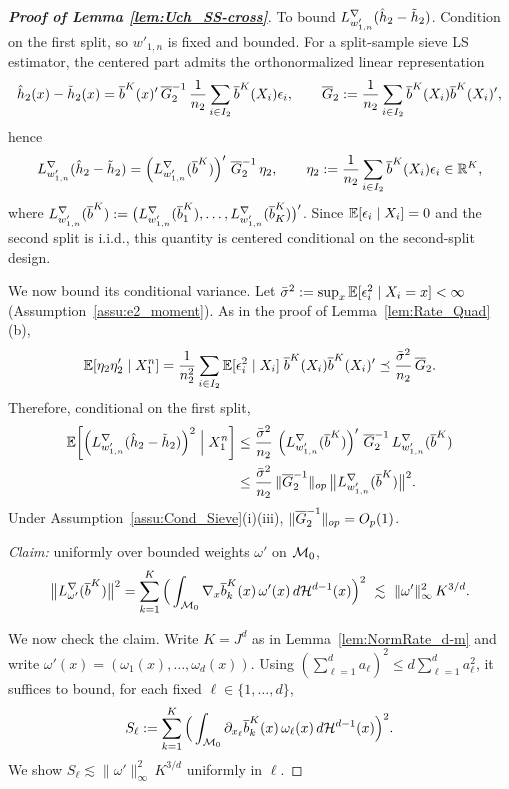 \documentclass[12pt,american]{article}
\newcommand{\cH}{\mathcal{H}}
\theoremstyle{definition}
\theoremstyle{plain}
\theoremstyle{definition}
\theoremstyle{plain}
\theoremstyle{plain}
\theoremstyle{plain}
\theoremstyle{plain}
\theoremstyle{plain}
\newcommand{\R}{\mathbb{R}}
\newcommand{\E}{\mathbb{E}}
\begin{document}
\begin{proof}[\textbf{Proof of Lemma \ref{lem:Uch_SS-cross}}]
To bound $L^{\nabla}_{w'_{1,n}}(\hat h_2-\tilde{h}_2)$.
Condition on the first split, so $w'_{1,n}$ is fixed and bounded.
For a split-sample sieve LS estimator, the centered part admits the orthonormalized linear representation
\[
\hat h_2(x)-\tilde{h}_2(x)
=\overline{b}^K(x)^{\prime}\,\overline{G}_2^{-1}\,\frac1{n_2}\sum_{i\in I_2}\overline{b}^K(X_i)\epsilon_i,
\qquad
\overline{G}_2:=\frac1{n_2}\sum_{i\in I_2}\overline{b}^K(X_i)\overline{b}^K(X_i)^{\prime},
\]
hence
\[
L^{\nabla}_{w'_{1,n}}(\hat h_2-\td h_2)
=
\left(L^{\nabla}_{w'_{1,n}}(\ol b^K)\right)^{\prime}\,
\ol G_2^{-1}\,\eta_2,
\qquad
\eta_2:=\frac1{n_2}\sum_{i\in I_2}\ol b^K(X_i)\e_i\in\R^K,
\]
where $L^{\nabla}_{w'_{1,n}}(\overline{b}^K):=\big(L^{\nabla}_{w'_{1,n}}(\overline{b}_1^K),\dots,L^{\nabla}_{w'_{1,n}}(\overline{b}_K^K)\big)^{\prime}$.
Since $\E[\e_i\mid X_i]=0$ and the second split is i.i.d., this quantity is centered conditional on the second-split design.

We now bound its conditional variance.
Let $\bar\s^2:=\sup_x \E[\e_i^2\mid X_i=x]<\infty$ (Assumption~\ref{assu:e2_moment}).
As in the proof of Lemma~\ref{lem:Rate_Quad}(b),
\[
\E[\eta_2\eta_2'\mid X_1^n]
=\frac1{n_2^2}\sum_{i\in I_2}\E[\e_i^2\mid X_i]\;\ol b^K(X_i)\ol b^K(X_i)'
\preceq \frac{\bar\s^2}{n_2}\,\ol G_2.
\]
Therefore, conditional on the first split,
\begin{align}
\E\!\left[\left(L^{\nabla}_{w'_{1,n}}(\hat h_2-\td h_2)\right)^2\Bigm| X_1^n\right]
&\le \frac{\bar\s^2}{n_2}\,
\left(L^{\nabla}_{w'_{1,n}}(\ol b^K)\right)^{\prime}\,
\ol G_2^{-1}\,
L^{\nabla}_{w'_{1,n}}(\ol b^K) \notag\\
&\le \frac{\bar\s^2}{n_2}\,\|\ol G_2^{-1}\|_{op}\,\big\|L^{\nabla}_{w'_{1,n}}(\ol b^K)\big\|^2 .
\label{eq:Var_Lgrad}
\end{align}
Under Assumption~\ref{assu:Cond_Sieve}(i)(iii), $\|\overline{G}_2^{-1}\|_{op}=O_p(1)$.

\smallskip
\noindent\emph{Claim:} uniformly over bounded weights $\omega'$ on $\mathcal{M}_0$,
\begin{equation}\label{eq:Lgrad_growth_claim}
\big\|L^{\nabla}_{\omega'}(\ol b^K)\big\|^2
=
\sum_{k=1}^K \Big(\int_{\cM_0}\nabla_x \ol b_k^K(x)\,\omega'(x)\,d\cH^{d-1}(x)\Big)^2
\ \lesssim\ \|\omega'\|_\infty^2\,K^{3/d}.
\end{equation}

We now check the claim. Write $K=J^{d}$ as in Lemma~\ref{lem:NormRate_d-m} and write $\omega'(x)=(\omega_1(x),\dots,\omega_d(x))$.
Using $(\sum_{\ell=1}^d a_\ell)^2\le d\sum_{\ell=1}^d a_\ell^2$, it suffices to bound, for each fixed $\ell\in\{1,\dots,d\}$,
\[
S_\ell
:=\sum_{k=1}^K \Big(\int_{\cM_0}\partial_{x_\ell}\ol b_k^K(x)\,\omega_\ell(x)\,d\cH^{d-1}(x)\Big)^2.
\]
We show $S_\ell\lesssim \|\omega'\|_\infty^2\,K^{3/d}$ uniformly in $\ell$.


\end{proof}
\end{document}
